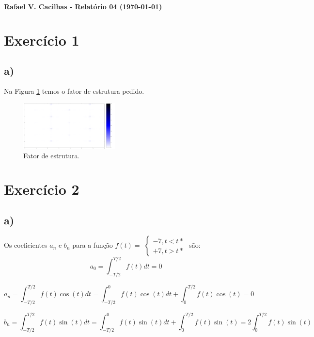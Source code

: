 \documentclass[a4wide]{report}
\begin{document}
\noindent
{\bf Rafael V. Cacilhas  - Relatório 04 (\today)}

\vspace{0.5cm}

\section*{Exercício 1}

\subsection*{a) }

Na Figura \ref{1} temos o fator de estrutura pedido.

\begin{figure}[!htb]
\centering
\includegraphics[width=0.447\textwidth]{1.pdf}
\caption{Fator de estrutura.}
\label{1}
\end{figure}



\section*{Exercício 2}

\subsection*{a)}

Os coeficientes $a_n$ e $b_n$ para a função $f(t) = $
$\begin{cases} 
-7, t < t* \\ 
+7, t > t*
\end{cases} $
são: 
\begin{equation}
a_0 = \int_{-T/2}^{T/2} f(t) dt = 0
\end{equation}

\begin{equation}
a_n = \int_{-T/2}^{T/2} f(t) \cos(t) dt = \int_{-T/2}^{0} f(t) \cos(t) dt + \int_{0}^{T/2} f(t) \cos(t) = 0
\end{equation}

\begin{equation*}
b_n = \int_{-T/2}^{T/2} f(t) \sin(t) dt = \int_{-T/2}^{0} f(t) \sin(t) dt + \int_{0}^{T/2} f(t) \sin(t) = 2\int_{0}^{T/2} f(t) \sin(t)
\end{equation*}
\end{document}
